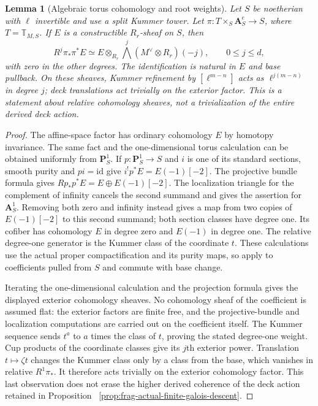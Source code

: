 \documentclass[11pt]{article}
\newtheorem{lemma}[theorem]{Lemma}
\theoremstyle{definition}
\theoremstyle{remark}
\begin{document}
\begin{lemma}[Algebraic torus cohomology and root weights]
\label{lem:frag-algebraic-torus-weights}
Let $S$ be noetherian with $\ell$ invertible and use a split Kummer
tower.  Let $\pi:T\times_S\mathbf A_S^e\to S$, where
$T=\mathbb T_{M,S}$.  If $E$ is a constructible $R_r$-sheaf on $S$,
then
\[
R^j\pi_*\pi^*E
 \simeq E\otimes_{R_r}\bigwedge^j(M^\vee\otimes R_r)(-j),
 \qquad 0\le j\le d,
\]
with zero in the other degrees.  The identification is natural in
$E$ and base pullback.  On these sheaves, Kummer refinement by
$[\ell^{m-n}]$ acts as $\ell^{j(m-n)}$ in degree $j$; deck
translations act trivially on the exterior factor.  This is a
statement about relative cohomology sheaves, not a trivialization of
the entire derived deck action.
\end{lemma}

\begin{proof}
The affine-space factor has ordinary cohomology $E$ by homotopy
invariance.  The same fact and the one-dimensional torus calculation
can be obtained uniformly from $\mathbf P^1_S$.  If
$p:\mathbf P^1_S\to S$ and $i$ is one of its standard sections,
smooth purity and $pi=\mathrm{id}$ give
$i^!p^*E=E(-1)[-2]$.  The projective bundle formula gives
$Rp_*p^*E=E\oplus E(-1)[-2]$.  The localization triangle for the
complement of infinity cancels the second summand and gives the
assertion for $\mathbf A^1_S$.  Removing both zero and infinity
instead gives a map from two copies of $E(-1)[-2]$ to this second
summand; both section classes have degree one.  Its cofiber has
cohomology $E$ in degree zero and $E(-1)$ in degree one.
The relative degree-one generator is the Kummer class of the
coordinate $t$.  These calculations use the actual proper
compactification and its purity maps, so apply to coefficients
pulled from $S$ and commute with base change.

Iterating the one-dimensional calculation and the projection formula
gives the displayed exterior cohomology sheaves.  No cohomology
sheaf of the coefficient is assumed flat: the exterior factors are
finite free, and the projective-bundle and localization computations
are carried out on the coefficient itself.  The Kummer sequence sends
$t^a$ to $a$ times the class of $t$, proving the stated degree-one
weight.  Cup products of the coordinate classes give its $j$th
exterior power.  Translation $t\mapsto\zeta t$ changes the Kummer
class only by a class from the base, which vanishes in relative
$R^1\pi_*$.  It therefore acts trivially on the exterior cohomology
factor.  This last observation does not erase the higher derived
coherence of the deck action retained in Proposition~
\ref{prop:frag-actual-finite-galois-descent}.
\end{proof}
\end{document}

